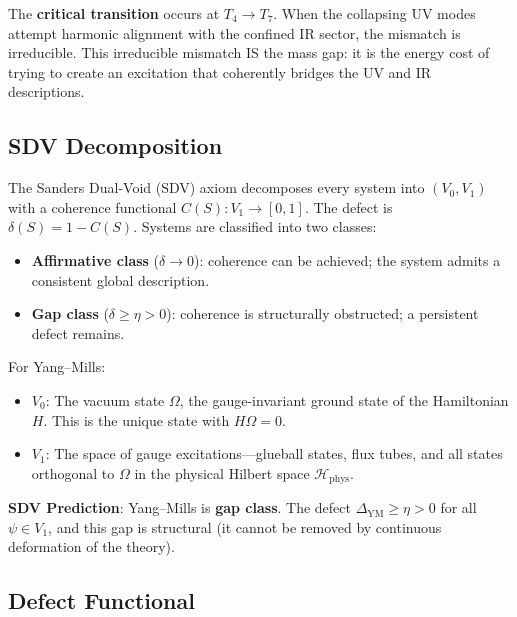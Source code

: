 \documentclass[11pt]{article}
\begin{document}
The \textbf{critical transition} occurs at $T_4 \to T_7$.  When the
collapsing UV modes attempt harmonic alignment with the confined IR
sector, the mismatch is irreducible.  This irreducible mismatch IS
the mass gap: it is the energy cost of trying to create an excitation
that coherently bridges the UV and IR descriptions.

\subsection{SDV Decomposition}

The Sanders Dual-Void (SDV) axiom decomposes every system into
$(V_0, V_1)$ with a coherence functional $C(S): V_1 \to [0,1]$.
The defect is $\delta(S) = 1 - C(S)$.  Systems are classified into
two classes:
\begin{itemize}
  \item \textbf{Affirmative class} ($\delta \to 0$): coherence can be
    achieved; the system admits a consistent global description.
  \item \textbf{Gap class} ($\delta \geq \eta > 0$): coherence is
    structurally obstructed; a persistent defect remains.
\end{itemize}

For Yang--Mills:
\begin{itemize}
  \item $V_0$: The vacuum state $\Omega$, the gauge-invariant ground
    state of the Hamiltonian $H$.  This is the unique state with
    $H\Omega = 0$.
  \item $V_1$: The space of gauge excitations---glueball states, flux
    tubes, and all states orthogonal to $\Omega$ in the physical
    Hilbert space $\mathcal{H}_{\mathrm{phys}}$.
\end{itemize}

\noindent\textbf{SDV Prediction}: Yang--Mills is \textbf{gap class}.
The defect $\Delta_{\mathrm{YM}} \geq \eta > 0$ for all
$\psi \in V_1$, and this gap is structural (it cannot be removed by
continuous deformation of the theory).

\subsection{Defect Functional}
\end{document}
